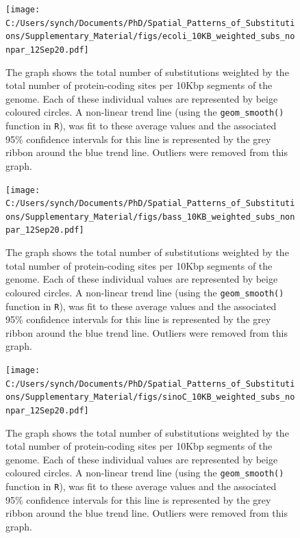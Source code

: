 \documentclass[12pt]{article}
\begin{document}
\begin{figure}[h]
	\begin{center}
		\texttt{[image: C:/Users/synch/Documents/PhD/Spatial\_Patterns\_of\_Substitutions/Supplementary\_Material/figs/ecoli\_10KB\_weighted\_subs\_nonpar\_12Sep20.pdf]}
		\caption{\label{fig:ecoli_nonpar}The graph shows the total number of substitutions weighted by the total number of protein-coding sites per 10Kbp segments of the genome. Each of these individual values are represented by beige coloured circles. A non-linear trend line (using the \texttt{geom\_smooth()} function in \texttt{R}), was fit to these average values and the associated 95\% confidence intervals for this line is represented by the grey ribbon around the blue trend line. Outliers were removed from this graph.}
	\end{center}
\end{figure}

\begin{figure}[h]
	\begin{center}
		\texttt{[image: C:/Users/synch/Documents/PhD/Spatial\_Patterns\_of\_Substitutions/Supplementary\_Material/figs/bass\_10KB\_weighted\_subs\_nonpar\_12Sep20.pdf]}
		\caption{\label{fig:bass_nonpar}The graph shows the total number of substitutions weighted by the total number of protein-coding sites per 10Kbp segments of the genome. Each of these individual values are represented by beige coloured circles. A non-linear trend line (using the \texttt{geom\_smooth()} function in \texttt{R}), was fit to these average values and the associated 95\% confidence intervals for this line is represented by the grey ribbon around the blue trend line. Outliers were removed from this graph.}
	\end{center}
\end{figure}

\begin{figure}[h]
	\begin{center}
		\texttt{[image: C:/Users/synch/Documents/PhD/Spatial\_Patterns\_of\_Substitutions/Supplementary\_Material/figs/sinoC\_10KB\_weighted\_subs\_nonpar\_12Sep20.pdf]}
		\caption{\label{fig:sinoC_nonpar}The graph shows the total number of substitutions weighted by the total number of protein-coding sites per 10Kbp segments of the genome. Each of these individual values are represented by beige coloured circles. A non-linear trend line (using the \texttt{geom\_smooth()} function in \texttt{R}), was fit to these average values and the associated 95\% confidence intervals for this line is represented by the grey ribbon around the blue trend line. Outliers were removed from this graph.}
	\end{center}
\end{figure}
\end{document}

